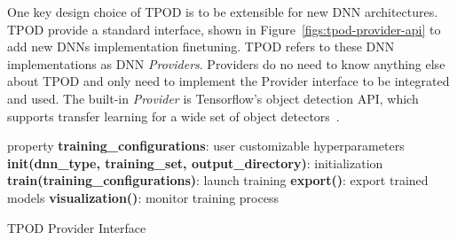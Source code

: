 One key design choice of TPOD is to be extensible for new DNN architectures.
TPOD provide a standard interface, shown in Figure~\ref{figs:tpod-provider-api}
to add new DNNs implementation finetuning. TPOD refers to these DNN
implementations as DNN \textit{Providers}. Providers do no need to know anything
else about TPOD and only need to implement the Provider interface to be
integrated and used. The built-in \textit{Provider} is Tensorflow's object
detection API, which supports transfer learning for a wide set of object
detectors~\cite{tfod2019}. 


\begin{algorithm} 
\SetAlgoLined
 property \textbf{training\_configurations}: user customizable hyperparameters\;
 \textbf{init(dnn\_type, training\_set, output\_directory)}: initialization\;
 \textbf{train(training\_configurations)}: launch training\;
 \textbf{export()}: export trained models\;
 \textbf{visualization()}: monitor training process\;
\caption{TPOD Provider Interface}
\label{figs:tpod-provider-interface}
\end{algorithm}